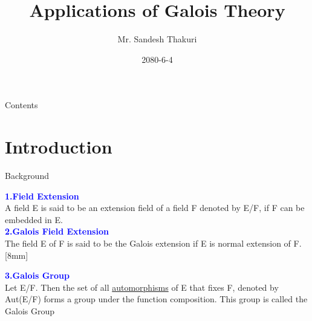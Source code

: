\documentclass{beamer}
\title{Applications of Galois Theory}
\author[Sandesh Thakuri]{Mr. Sandesh Thakuri}
\institute[CDM, TU]
{\footnotesize{Central Department of Mathematics, TU}}
\date{2080-6-4}
\begin{document}
\begin{frame}[plain]
  \titlepage
\end{frame}

\small
\begin{frame}{Contents}
  \tableofcontents
\end{frame}

\section{Introduction}
\begin{frame}{Background}

\textcolor{blue}{\textbf{1.Field Extension}}\\[2mm]
A field E is said to be an extension field of a field F denoted by E/F, if F can be embedded in E.\\[8mm]

\textcolor{blue}{\textbf{2.Galois Field Extension}}\\[2mm]
The field E of F is said to be the Galois extension if E is normal extension of F.[8mm]

\textcolor{blue}{\textbf{3.Galois Group}}\\[2mm]
Let E/F. Then the set of all \underline{automorphisms} of E that
fixes F, denoted by Aut(E/F) forms a group under the function
composition. This group is called the Galois Group%

\end{frame}
\end{document}
